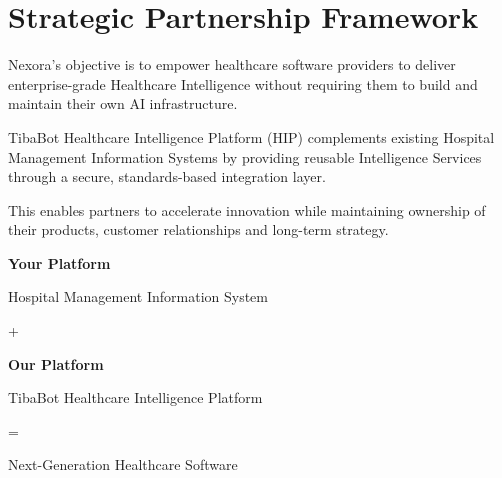 
\section{Strategic Partnership Framework}

Nexora's objective is to empower healthcare software providers to deliver enterprise-grade Healthcare Intelligence without requiring them to build and maintain their own AI infrastructure.

TibaBot Healthcare Intelligence Platform (HIP) complements existing Hospital Management Information Systems by providing reusable Intelligence Services through a secure, standards-based integration layer.

This enables partners to accelerate innovation while maintaining ownership of their products, customer relationships and long-term strategy.

\vspace{6mm}

\begin{callout}

\centering

\Large

\textbf{Your Platform}

\vspace{2mm}

Hospital Management Information System

\vspace{5mm}

+

\vspace{5mm}

\Large

\textbf{Our Platform}

\vspace{2mm}

TibaBot Healthcare Intelligence Platform

\vspace{5mm}

=

\vspace{5mm}

\Huge

Next-Generation Healthcare Software

\end{callout}

